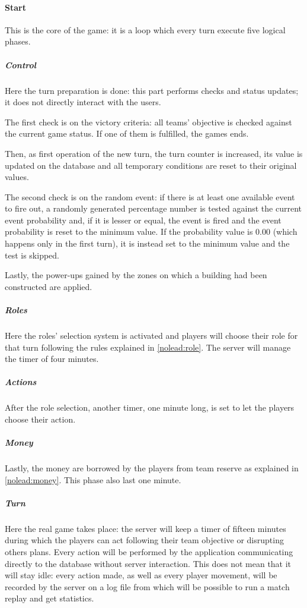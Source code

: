 		\paragraph{Start}
		\label{workflow:start}
			
			This is the core of the game: it is a loop which every turn execute five logical phases.
				
			\subparagraph{Control}
			
				Here the turn preparation is done: this part performs checks and status updates; it does not directly interact with the users.
			
				The first check is on the victory criteria: all teams' objective is checked against the current game status. If one of them is fulfilled, the games ends.
				
				Then, as first operation of the new turn, the turn counter is increased, its value is updated on the database and all temporary conditions are reset to their original values.
				
				The second check is on the random event: if there is at least one available event to fire out, a randomly generated percentage number is tested against the current event probability and, if it is lesser or equal, the event is fired and the event probability is reset to the minimum value.
				If the probability value is 0.00 (which happens only in the first turn), it is instead set to the minimum value and the test is skipped.
				
				Lastly, the power-ups gained by the zones on which a building had been constructed are applied.
				
			\subparagraph{Roles}
			
				Here the roles' selection system is activated and players will choose their role for that turn following the rules explained in \autoref{nolead:role}.
				The server will manage the timer of four minutes.
				
			\subparagraph{Actions}
				
				After the role selection, another timer, one minute long, is set to let the players choose their action.
				
			\subparagraph{Money}
				
				Lastly, the money are borrowed by the players from team reserve as explained in \autoref{nolead:money}.
				This phase also last one minute.
							
			\subparagraph{Turn}
			
				Here the real game takes place: the server will keep a timer of fifteen minutes during which the players can act following their team objective or disrupting others plans.
				Every action will be performed by the application communicating directly to the database without server interaction. This does not mean that it will stay idle: every action made, as well as every player movement, will be recorded by the server on a log file from which will be possible to run a match replay and get statistics.
			
